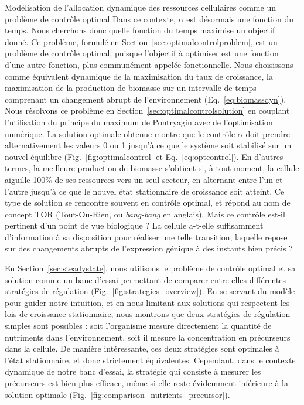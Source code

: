 \begin{chapter_summary}{Modélisation de l'allocation dynamique des ressources cellulaires comme un problème de contrôle optimal}
Dans ce contexte, $\alpha$ est désormais une fonction du temps.
Nous cherchons donc quelle fonction du temps maximise un objectif donné.
Ce problème, formulé en Section~\ref{sec:optimalcontrolproblem}, est un problème de contrôle optimal, puisque l'objectif à optimiser est une fonction d'une autre fonction, plus communément appelée fonctionnelle.
Nous choisissons comme équivalent dynamique de la maximisation du taux de croissance, la maximisation de la production de biomasse sur un intervalle de temps comprenant un changement abrupt de l'environnement (Eq.~\ref{eq:biomassdyn}).
Nous résolvons ce problème en Section~\ref{sec:optimalcontrolsolution} en couplant l'utilisation du principe du maximum de Pontryagin avec de l'optimisation numérique.
La solution optimale obtenue montre que le contrôle $\alpha$ doit prendre alternativement les valeurs 0 ou 1 jusqu'à ce que le système soit stabilisé sur un nouvel équilibre (Fig.~\ref{fig:optimalcontrol} et Eq.~\ref{eq:optcontrol}).
En d'autres termes, la meilleure production de biomasse s'obtient si, à tout moment, la cellule aiguille 100\% de ses ressources vers un seul secteur, en alternant entre l'un et l'autre jusqu'à ce que le nouvel état stationnaire de croissance soit atteint.
Ce type de solution se rencontre souvent en contrôle optimal, et répond au nom de concept TOR (Tout-Ou-Rien, ou \textit{bang-bang} en anglais).
Mais ce contrôle est-il pertinent d'un point de vue biologique ?
La cellule a-t-elle suffisamment d'information à sa disposition pour réaliser une telle transition, laquelle repose sur des changements abrupts de l'expression génique à des instants bien précis ?

En Section~\ref{sec:steadystate}, nous utilisons le problème de contrôle optimal et sa solution comme un banc d'essai permettant de comparer entre elles différentes stratégies de régulation (Fig.~\ref{fig:strategies_overview}).
En se servant du modèle pour guider notre intuition, et en nous limitant aux solutions qui respectent les lois de croissance stationnaire, nous montrons que deux stratégies de régulation simples sont possibles : soit l'organisme mesure directement la quantité de nutriments dans l'environnement, soit il mesure la concentration en précurseurs dans la cellule.
De manière intéressante, ces deux stratégies sont optimales à l'état stationnaire, et donc strictement équivalentes.
Cependant, dans le contexte dynamique de notre banc d'essai, la stratégie qui consiste à mesurer les précurseurs est bien plus efficace, même si elle reste évidemment inférieure à la solution optimale (Fig.~\ref{fig:comparison_nutrients_precursor}).


\end{chapter_summary}
